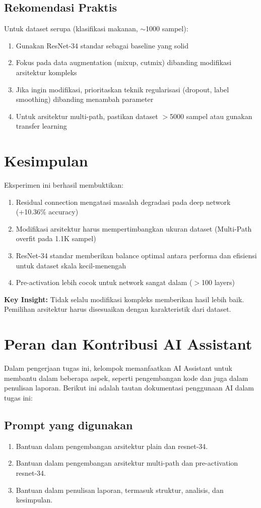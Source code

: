 \documentclass[11pt,a4paper]{article}
\begin{document}
\subsection{Rekomendasi Praktis}
Untuk dataset serupa (klasifikasi makanan, $\sim$1000 sampel):
\begin{enumerate}
    \item Gunakan ResNet-34 standar sebagai baseline yang solid
    \item Fokus pada data augmentation (mixup, cutmix) dibanding modifikasi arsitektur kompleks
    \item Jika ingin modifikasi, prioritaskan teknik regularisasi (dropout, label smoothing) dibanding menambah parameter
    \item Untuk arsitektur multi-path, pastikan dataset $>$5000 sampel atau gunakan transfer learning
\end{enumerate}

\section{Kesimpulan}
Eksperimen ini berhasil membuktikan:
\begin{enumerate}
    \item Residual connection mengatasi masalah degradasi pada deep network (+10.36\% accuracy)
    \item Modifikasi arsitektur harus mempertimbangkan ukuran dataset (Multi-Path overfit pada 1.1K sampel)
    \item ResNet-34 standar memberikan balance optimal antara performa dan efisiensi untuk dataset skala kecil-menengah
    \item Pre-activation lebih cocok untuk network sangat dalam ($>$100 layers)
\end{enumerate}

\textbf{Key Insight:} Tidak selalu modifikasi kompleks memberikan hasil lebih baik. Pemilihan arsitektur harus disesuaikan dengan karakteristik dari dataset.

\section{Peran dan Kontribusi AI Assistant}
Dalam pengerjaan tugas ini, kelompok memanfaatkan AI Assistant untuk membantu dalam beberapa aspek, seperti pengembangan kode dan juga dalam penulisan laporan.
Berikut ini adalah tautan dokumentasi penggunaan AI dalam tugas ini:

\subsection{Prompt yang digunakan}
\begin{enumerate}
    \item Bantuan dalam pengembangan arsitektur plain dan resnet-34.
    \item Bantuan dalam pengembangan arsitektur multi-path dan pre-activation resnet-34.
    \item Bantuan dalam penulisan laporan, termasuk struktur, analisis, dan kesimpulan.
\end{enumerate}
\end{document}
